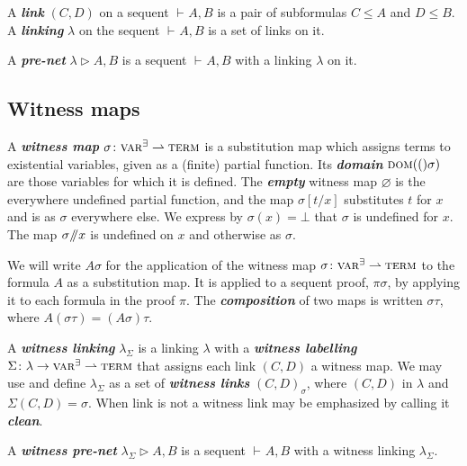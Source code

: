 \documentclass[UKenglish]{lipics-v2016}
\theoremstyle{plain}
\newcommand\defn[1]{\textit{\textbf{#1}}}
\newcommand\varA{\textsc{var}^\forall}
\newcommand\varE{\textsc{var}^\exists}
\newcommand\terms{\textsc{term}}
\newcommand\dom[1]{\textsc{dom}(#1)}
\newcommand\+{+}
\renewcommand\*{\times}
\newcommand\seq[3][]{{\vdash_{#1}}#2,#3}
\newcommand\net[3]{#1\triangleright #2,#3}
\newcommand\link[3][\sigma]{(#2,#3)_{#1}}
\newcommand\minus{\mathop{\!/\mathchoice{\kern-3pt}{\kern-3pt}{\kern-2.5pt}{\kern-2pt}/\!}}
\begin{document}
A \defn{link} $(C,D)$ on a sequent $\seq AB$ is a pair of subformulas $C\leq A$ and $D\leq B$. 
A \defn{linking} $\lambda$ on the sequent $\seq AB$ is a set of links on it.

\begin{definition}
A \defn{pre-net} $\net\lambda AB$ is a sequent $\seq AB$ with a linking $\lambda$ on it.
\end{definition}



\subsection{Witness maps}

A \defn{witness map} $\sigma\colon \varE \rightharpoonup \terms$ is a substitution map which assigns terms to existential variables, given as a (finite) partial function. Its \defn{domain} $\dom(\sigma)$ are those variables for which it is defined. The \defn{empty} witness map $\varnothing$ is the everywhere undefined partial function, and the map $\sigma[t/x]$ substitutes $t$ for $x$ and is as $\sigma$ everywhere else. We express by $\sigma(x)=\bot$ that $\sigma$ is undefined for $x$. The map $\sigma\minus x$ is undefined on $x$ and otherwise as $\sigma$. 

We will write $A\sigma$ for the application of the witness map $\sigma\colon\varE\rightharpoonup\terms$ to the formula $A$ as a substitution map. It is applied to a sequent proof, $\pi\sigma$, by applying it to each formula in the proof $\pi$. The \defn{composition} of two maps is written $\sigma\tau$, where $A(\sigma\tau)=(A\sigma)\tau$.

A \defn{witness linking} $\lambda_\Sigma$ is a linking $\lambda$ with a \defn{witness labelling} $\Sigma\colon\lambda\to \varE\rightharpoonup\terms$ that assigns each link $(C,D)$ a witness map. We may use and define $\lambda_\Sigma$ as a set of \defn{witness links} $\link CD$, where $(C,D)$ in $\lambda$ and $\Sigma(C,D)=\sigma$. When link is not a witness link may be emphasized by calling it \defn{clean}.

\begin{definition}
A \defn{witness pre-net} $\net{\lambda_\Sigma}AB$ is a sequent $\seq AB$ with a witness linking $\lambda_\Sigma$.
%
%
%
\end{definition}
\end{document}
